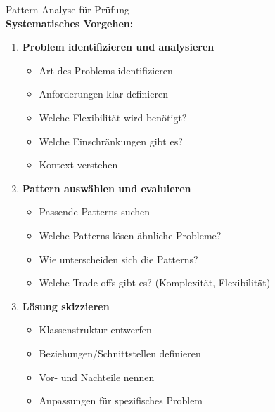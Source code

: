 \begin{KR}{Pattern-Analyse für Prüfung}\\
\textbf{Systematisches Vorgehen:}
\begin{enumerate}
    \item \textbf{Problem identifizieren und analysieren}
    \begin{itemize}
        \item Art des Problems identifizieren
        \item Anforderungen klar definieren
        \item Welche Flexibilität wird benötigt?
        \item Welche Einschränkungen gibt es?
        \item Kontext verstehen
    \end{itemize}
    
    \item \textbf{Pattern auswählen und evaluieren}
    \begin{itemize}
        \item Passende Patterns suchen
        \item Welche Patterns lösen ähnliche Probleme?
        \item Wie unterscheiden sich die Patterns?
        \item Welche Trade-offs gibt es? (Komplexität, Flexibilität)
    \end{itemize}
    
    \item \textbf{Lösung skizzieren}
    \begin{itemize}
        \item Klassenstruktur entwerfen
        \item Beziehungen/Schnittstellen definieren
        \item Vor- und Nachteile nennen
        \item Anpassungen für spezifisches Problem
    \end{itemize}
\end{enumerate}
\end{KR}

